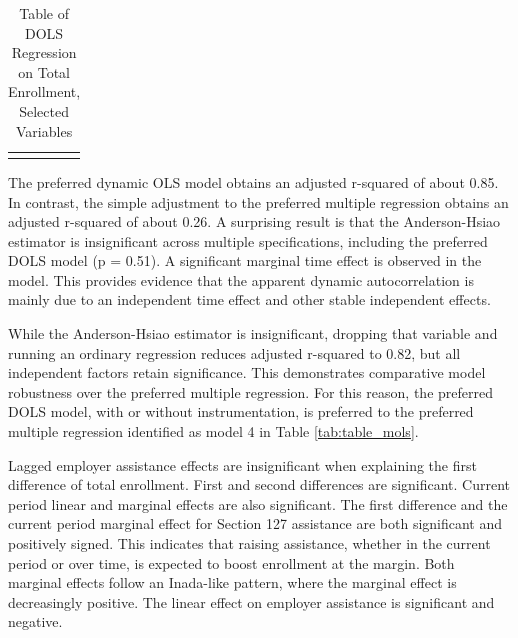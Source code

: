 \documentclass[review]{elsarticle}
\begin{document}
\begin{table}
    \caption{Table of DOLS Regression on Total Enrollment, Selected Variables}
    \begin{tabularx}{\textwidth}{X}
        \centering
        
    \end{tabularx}
    \label{tab:table_dols}
\end{table}

The preferred dynamic OLS model obtains an adjusted r-squared of about 0.85.
In contrast, the simple adjustment to the preferred multiple regression
obtains an adjusted r-squared of about 0.26.
A surprising result is that the Anderson-Hsiao estimator is insignificant
across multiple specifications, including the preferred DOLS model (p = 0.51).
A significant marginal time effect is observed in the model.
This provides evidence that the apparent dynamic autocorrelation is
mainly due to an independent time effect and other stable independent effects.

While the Anderson-Hsiao estimator is insignificant,
dropping that variable and running an ordinary regression reduces adjusted r-squared to 0.82,
but all independent factors retain significance.
This demonstrates comparative model robustness over the preferred multiple regression.
For this reason, the preferred DOLS model, with or without instrumentation,
is preferred to the preferred multiple regression identified as
model 4 in Table \ref{tab:table_mols}.

Lagged employer assistance effects are insignificant when explaining the first difference of total enrollment.
First and second differences are significant.
Current period linear and marginal effects are also significant.
The first difference and the current period marginal effect for
Section 127 assistance are both significant and positively signed.
This indicates that raising assistance,
whether in the current period or over time,
is expected to boost enrollment at the margin.
Both marginal effects follow an Inada-like pattern, where the marginal effect is decreasingly positive.
The linear effect on employer assistance is significant and negative.
\end{document}
